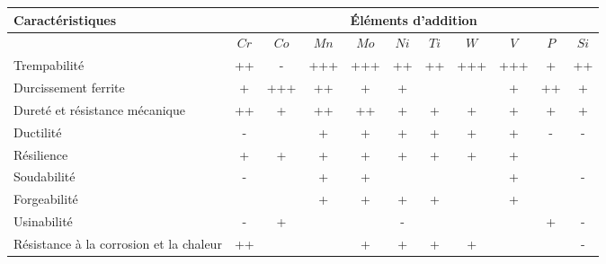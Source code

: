 \documentclass[11pt,oneside]{article}
\begin{document}
\begin{center}
\begin{tabular}{|p{}|c|c|c|c|c|c|c|c|c|c|}
\hline
Caractéristiques & \multicolumn{10}{c|}{Éléments d'addition} \\
\hline
& $Cr$ & $Co$ & $Mn$ & $Mo$ & $Ni$ & $Ti$ & $W$ & $V$ & $P$ & $Si$ \\ \hline
Trempabilité & ++ & - & +++&+++ &++&++&+++&+++&+&++ \\ \hline
Durcissement ferrite&+&+++&++&+&+&&&+&++&+ \\ \hline
Dureté et résistance mécanique&++&+&++&++&+&+&+&+&+&+ \\ \hline
Ductilité &-&&+&+&+&+&+&+&-&- \\ \hline
Résilience&+&+&+&+&+&+&+&+&& \\ \hline\hline
Soudabilité &-&&+&+&&&&+&&- \\ \hline
Forgeabilité &&&+&+&+&+&&+&& \\ \hline
Usinabilité &-&+&&&-&&&&+& -\\ \hline
Résistance à la corrosion et la chaleur &++&&&+&+&+&+&&&- \\ \hline

\end{tabular}
\end{center}


\begin{thebibliography}{2}




\end{thebibliography}
\end{document}

